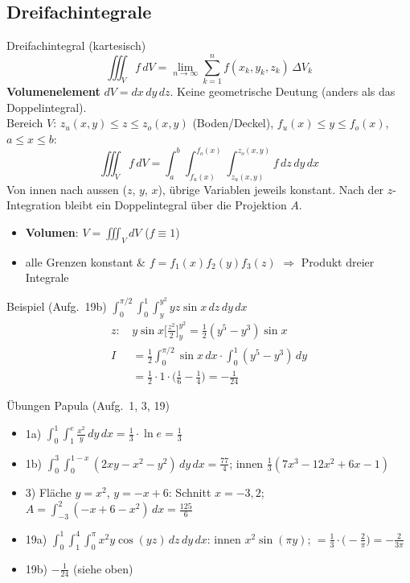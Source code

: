 \documentclass[a4paper, fontsize=7pt]{scrartcl}
\begin{document}
\subsection{Dreifachintegrale}

\begin{mainbox}{Dreifachintegral (kartesisch)}
$$\iiint_V f\, dV = \lim_{n \to \infty} \sum_{k=1}^n
f(x_k, y_k, z_k)\, \Delta V_k$$
\textbf{Volumenelement} $dV = dx\, dy\, dz$. Keine geometrische Deutung
(anders als das Doppelintegral).\\[2pt]
Bereich $V$: $z_u(x, y) \le z \le z_o(x, y)$ (Boden/Deckel),
$f_u(x) \le y \le f_o(x)$, $a \le x \le b$:
$$\iiint_V f\, dV = \int_a^b \! \int_{f_u(x)}^{f_o(x)} \!
\int_{z_u(x,y)}^{z_o(x,y)} f\, dz\, dy\, dx$$
Von innen nach aussen ($z$, $y$, $x$), übrige Variablen jeweils konstant.
Nach der $z$-Integration bleibt ein Doppelintegral über die Projektion $A$.
\begin{itemize}
    \item \textbf{Volumen}: $V = \iiint_V dV$ ($f \equiv 1$)
    \item alle Grenzen konstant \& $f = f_1(x) f_2(y) f_3(z)$
          $\Rightarrow$ Produkt dreier Integrale
\end{itemize}
\end{mainbox}

\begin{subbox}{Beispiel (Aufg.\ 19b)}
$\int_0^{\pi/2} \int_0^1 \int_y^{y^2} yz \sin x\, dz\, dy\, dx$
\begin{align*}
z\text{: } & y \sin x \Big[\tfrac{z^2}{2}\Big]_y^{y^2}
  = \tfrac12 (y^5 - y^3) \sin x\\
I &= \tfrac12 \int_0^{\pi/2} \sin x\, dx \cdot \int_0^1 (y^5 - y^3)\, dy\\
  &= \tfrac12 \cdot 1 \cdot \big(\tfrac16 - \tfrac14\big) = -\tfrac{1}{24}
\end{align*}
\end{subbox}

\begin{subbox}{Übungen Papula (Aufg.\ 1, 3, 19)}
\begin{itemize}
    \item 1a) $\int_0^1 \int_1^e \frac{x^2}{y}\, dy\, dx
          = \frac13 \cdot \ln e = \frac13$
    \item 1b) $\int_0^3 \int_0^{1-x} (2xy - x^2 - y^2)\, dy\, dx
          = \frac{77}{4}$; innen
          $\frac13(7x^3 - 12x^2 + 6x - 1)$
    \item 3) Fläche $y = x^2$, $y = -x + 6$: Schnitt $x = -3, 2$;
          $A = \int_{-3}^{2} (-x + 6 - x^2)\, dx = \frac{125}{6}$
    \item 19a) $\int_0^1 \int_1^4 \int_0^\pi x^2 y \cos(yz)\, dz\, dy\, dx$:
          innen $x^2 \sin(\pi y)$; $= \frac13 \cdot \big(-\frac2\pi\big)
          = -\frac{2}{3\pi}$
    \item 19b) $-\frac{1}{24}$ (siehe oben)
\end{itemize}
\end{subbox}
\end{document}

